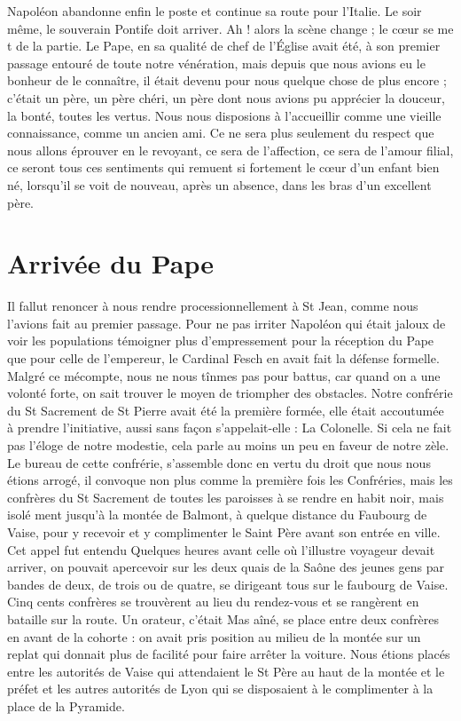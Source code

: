 \documentclass[11pt,a4paper]{report}
\begin{document}
Napoléon abandonne enfin le poste et continue sa route pour l'Italie. Le soir même, le souverain Pontife doit arriver. Ah ! alors la scène change ; le cœur se me t de la partie. Le Pape, en sa qualité de chef de l'Église avait été, à son premier passage entouré de toute notre vénération, mais depuis que nous avions eu le bonheur de le connaître, il était devenu pour nous quelque chose de plus encore ; c'était un père, un père chéri, un père dont nous avions pu apprécier la douceur, la bonté, toutes les vertus. Nous nous disposions à l'accueillir comme une vieille connaissance, comme un ancien ami. Ce ne sera plus seulement du respect que nous allons éprouver en le revoyant, ce sera de l'affection, ce sera de l'amour filial, ce seront tous ces sentiments qui remuent si fortement le cœur d'un enfant bien né, lorsqu'il se voit de nouveau, après un absence, dans les bras d'un excellent père.

\section*{Arrivée du Pape}

Il fallut renoncer à nous rendre processionnellement à St Jean, comme nous l'avions fait au premier passage. Pour ne pas irriter Napoléon qui était jaloux de voir les populations témoigner plus d'empressement pour la réception du Pape que pour celle de l'empereur, le Cardinal Fesch en avait fait la défense formelle. Malgré ce mécompte, nous ne nous tînmes pas pour battus, car quand on a une volonté forte, on sait trouver le moyen de triompher des obstacles. Notre confrérie du St Sacrement de St Pierre avait été la première formée, elle était accoutumée à prendre l'initiative, aussi sans façon s'appelait-elle : La Colonelle. Si cela ne fait pas l'éloge de notre modestie, cela parle au moins un peu en faveur de notre zèle. Le bureau de cette confrérie, s'assemble donc en vertu du droit que nous nous étions arrogé, il convoque non plus comme la première fois les Confréries, mais les confrères du St Sacrement de toutes les paroisses à se rendre en habit noir, mais isolé ment jusqu'à la montée de Balmont, à quelque distance du Faubourg de Vaise, pour y recevoir et y complimenter le Saint Père avant son entrée en ville. Cet appel fut entendu Quelques heures avant celle où l'illustre voyageur devait arriver, on pouvait apercevoir sur les deux quais de la Saône des jeunes gens par bandes de deux, de trois ou de quatre, se dirigeant tous sur le faubourg de Vaise. Cinq cents confrères se trouvèrent au lieu du rendez-vous et se rangèrent en bataille sur la route. Un orateur, c'était Mas aîné, se place entre deux confrères en avant de la cohorte : on avait pris position au milieu de la montée sur un replat qui donnait plus de facilité pour faire arrêter la voiture. Nous étions placés entre les autorités de Vaise qui attendaient le St Père au haut de la montée et le préfet et les autres autorités de Lyon qui se disposaient à le complimenter à la place de la Pyramide.
\end{document}
